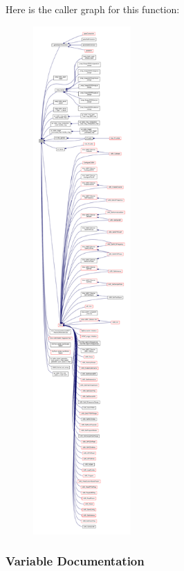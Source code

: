 Here is the caller graph for this function\+:
\nopagebreak
\begin{figure}[H]
\begin{center}
\leavevmode
\includegraphics[height=550pt]{da/d66/soapysdr_2build_2docs_2html_2jquery_8js_a2335e57f79b6acfb6de59c235dc8a83e_icgraph}
\end{center}
\end{figure}




\subsubsection{Variable Documentation}
